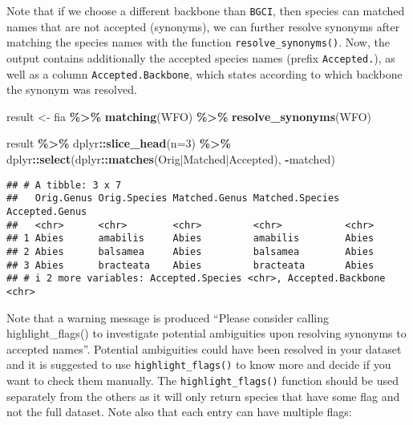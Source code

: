 \documentclass[
  11pt,
]{article}
\newenvironment{Shaded}{\begin{snugshade}}{\end{snugshade}}
\newcommand{\AttributeTok}[1]{\textcolor[rgb]{0.13,0.29,0.53}{#1}}
\newcommand{\DecValTok}[1]{\textcolor[rgb]{0.00,0.00,0.81}{#1}}
\newcommand{\FunctionTok}[1]{\textcolor[rgb]{0.13,0.29,0.53}{\textbf{#1}}}
\newcommand{\NormalTok}[1]{#1}
\newcommand{\OtherTok}[1]{\textcolor[rgb]{0.56,0.35,0.01}{#1}}
\newcommand{\SpecialCharTok}[1]{\textcolor[rgb]{0.81,0.36,0.00}{\textbf{#1}}}
\newcommand{\StringTok}[1]{\textcolor[rgb]{0.31,0.60,0.02}{#1}}
\begin{document}
\noindent Note that if we choose a different backbone than \verb|BGCI|,
then species can matched names that are not accepted (synonyms), we can
further resolve synonyms after matching the species names with the
function \verb|resolve_synonyms()|. Now, the output contains
additionally the accepted species names (prefix \verb|Accepted.|), as
well as a column \verb|Accepted.Backbone|, which states according to
which backbone the synonym was resolved.

\begin{Shaded}
\begin{Highlighting}[]
\NormalTok{result }\OtherTok{\textless{}{-}}\NormalTok{ fia }\SpecialCharTok{\%\textgreater{}\%} 
  \FunctionTok{matching}\NormalTok{(}\StringTok{\textquotesingle{}WFO\textquotesingle{}}\NormalTok{) }\SpecialCharTok{\%\textgreater{}\%} 
  \FunctionTok{resolve\_synonyms}\NormalTok{(}\StringTok{\textquotesingle{}WFO\textquotesingle{}}\NormalTok{)}
\end{Highlighting}
\end{Shaded}

\begin{Shaded}
\begin{Highlighting}[]
\NormalTok{result }\SpecialCharTok{\%\textgreater{}\%} 
\NormalTok{  dplyr}\SpecialCharTok{::}\FunctionTok{slice\_head}\NormalTok{(}\AttributeTok{n=}\DecValTok{3}\NormalTok{) }\SpecialCharTok{\%\textgreater{}\%} 
\NormalTok{  dplyr}\SpecialCharTok{::}\FunctionTok{select}\NormalTok{(dplyr}\SpecialCharTok{::}\FunctionTok{matches}\NormalTok{(}\StringTok{\textquotesingle{}Orig|Matched|Accepted\textquotesingle{}}\NormalTok{), }\SpecialCharTok{{-}}\StringTok{\textquotesingle{}matched\textquotesingle{}}\NormalTok{)}
\end{Highlighting}
\end{Shaded}

\begin{verbatim}
## # A tibble: 3 x 7
##   Orig.Genus Orig.Species Matched.Genus Matched.Species Accepted.Genus
##   <chr>      <chr>        <chr>         <chr>           <chr>         
## 1 Abies      amabilis     Abies         amabilis        Abies         
## 2 Abies      balsamea     Abies         balsamea        Abies         
## 3 Abies      bracteata    Abies         bracteata       Abies         
## # i 2 more variables: Accepted.Species <chr>, Accepted.Backbone <chr>
\end{verbatim}

\noindent Note that a warning message is produced ``Please consider
calling highlight\_flags() to investigate potential ambiguities upon
resolving synonyms to accepted names''. Potential ambiguities could have
been resolved in your dataset and it is suggested to use
\verb|highlight_flags()| to know more and decide if you want to check
them manually. The \verb|highlight_flags()| function should be used
separately from the others as it will only return species that have some
flag and not the full dataset. Note also that each entry can have
multiple flags:
\end{document}
